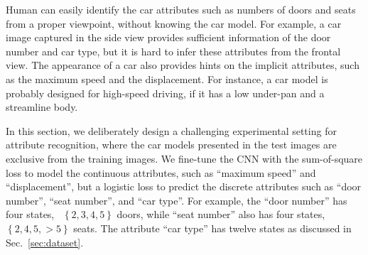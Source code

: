 \documentclass[10pt,twocolumn,letterpaper]{article}
\begin{document}
Human can easily identify the car attributes such as numbers of doors and seats from a proper viewpoint, without knowing the car model.
%
For example, a car image captured in the side view provides sufficient information of the door number and car type, but it is hard to infer these attributes from the frontal view.
%
The appearance of a car also provides hints on the implicit attributes, such as the maximum speed and the displacement. For instance, a car model is probably designed for high-speed driving, if it has a low under-pan and a streamline body.

In this section, we deliberately design a challenging experimental setting for attribute recognition, where the car models presented in the test images are exclusive from the training images.
%
We fine-tune the CNN with the sum-of-square loss to model the continuous attributes, such as ``maximum speed'' and ``displacement'', but a logistic loss to predict the discrete attributes such as ``door number'', ``seat number'', and ``car type''. For example, the ``door number'' has four states, \ie~$\left\{2, 3, 4, 5\right\}$ doors, while ``seat number'' also has four states, \ie~$\left\{2, 4, 5, >5\right\}$ seats. The attribute ``car type'' has twelve states as discussed in Sec.~\ref{sec:dataset}.



\end{document}
